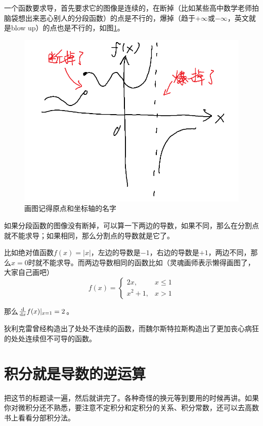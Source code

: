 一个函数要求导，首先要求它的图像是连续的，在断掉（比如某些高中数学老师拍脑袋想出来恶心别人的分段函数）的点是不行的，爆掉（趋于$+\infty$或$-\infty$，英文就是blow up）的点也是不行的，如图\ref{fig-bad-deri}。
\begin{figure}[htb]
\centering
\includegraphics[scale=0.5]{fig/bad-deri}
\caption{画图记得原点和坐标轴的名字}
\label{fig-bad-deri}
\end{figure}

如果分段函数的图像没有断掉，可以算一下两边的导数，如果不同，那么在分割点就不能求导；如果相同，那么分割点的导数就是它了。

比如绝对值函数$f(x)=|x|$，左边的导数是$-1$，右边的导数是$+1$，两边不同，那么$x=0$时就不能求导。而两边导数相同的函数比如（灵魂画师表示懒得画图了，大家自己画吧）
\begin{equation*}
f(x)=
\begin{cases}
2x, &x \le 1 \\
x^2+1, &x>1
\end{cases}
\end{equation*}

那么$\frac{\mathop{}\!\mathrm{d}}{\mathop{}\!\mathrm{d} x} f(x)|_{x=1}=2$。

狄利克雷曾经构造出了处处不连续的函数，而魏尔斯特拉斯构造出了更加丧心病狂的处处连续但不可导的函数。
\section{积分就是导数的逆运算}
把这节的标题读一遍，然后就讲完了。各种奇怪的换元等到要用的时候再讲。如果你对微积分还不熟悉，要注意不定积分和定积分的关系、积分常数，还可以去高数书上看看分部积分法。

